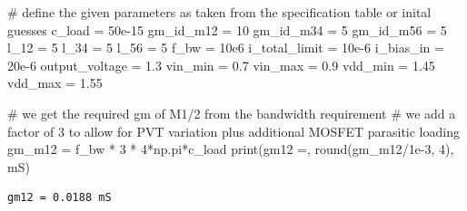 \documentclass[
  a4paper,
  DIV=11,
  numbers=noendperiod]{scrartcl}
\newenvironment{Shaded}{\begin{snugshade}}{\end{snugshade}}
\newcommand{\BuiltInTok}[1]{\textcolor[rgb]{0.00,0.23,0.31}{#1}}
\newcommand{\CommentTok}[1]{\textcolor[rgb]{0.37,0.37,0.37}{#1}}
\newcommand{\DecValTok}[1]{\textcolor[rgb]{0.68,0.00,0.00}{#1}}
\newcommand{\FloatTok}[1]{\textcolor[rgb]{0.68,0.00,0.00}{#1}}
\newcommand{\NormalTok}[1]{\textcolor[rgb]{0.00,0.23,0.31}{#1}}
\newcommand{\OperatorTok}[1]{\textcolor[rgb]{0.37,0.37,0.37}{#1}}
\newcommand{\StringTok}[1]{\textcolor[rgb]{0.13,0.47,0.30}{#1}}
\begin{document}
\begin{tcolorbox}
\begin{Shaded}
\begin{Highlighting}[]
\CommentTok{\# define the given parameters as taken from the specification table or inital guesses}
\NormalTok{c\_load }\OperatorTok{=} \FloatTok{50e{-}15}
\NormalTok{gm\_id\_m12 }\OperatorTok{=} \DecValTok{10}
\NormalTok{gm\_id\_m34 }\OperatorTok{=} \DecValTok{5}
\NormalTok{gm\_id\_m56 }\OperatorTok{=} \DecValTok{5}
\NormalTok{l\_12 }\OperatorTok{=} \DecValTok{5}
\NormalTok{l\_34 }\OperatorTok{=} \DecValTok{5}
\NormalTok{l\_56 }\OperatorTok{=} \DecValTok{5}
\NormalTok{f\_bw }\OperatorTok{=} \FloatTok{10e6}
\NormalTok{i\_total\_limit }\OperatorTok{=} \FloatTok{10e{-}6}
\NormalTok{i\_bias\_in }\OperatorTok{=} \FloatTok{20e{-}6}
\NormalTok{output\_voltage }\OperatorTok{=} \FloatTok{1.3}
\NormalTok{vin\_min }\OperatorTok{=} \FloatTok{0.7}
\NormalTok{vin\_max }\OperatorTok{=} \FloatTok{0.9}
\NormalTok{vdd\_min }\OperatorTok{=} \FloatTok{1.45}
\NormalTok{vdd\_max }\OperatorTok{=} \FloatTok{1.55}
\end{Highlighting}
\end{Shaded}

\begin{Shaded}
\begin{Highlighting}[]
\CommentTok{\# we get the required gm of M1/2 from the bandwidth requirement}
\CommentTok{\# we add a factor of 3 to allow for PVT variation plus additional MOSFET parasitic loading}
\NormalTok{gm\_m12 }\OperatorTok{=}\NormalTok{ f\_bw }\OperatorTok{*} \DecValTok{3} \OperatorTok{*} \DecValTok{4}\OperatorTok{*}\NormalTok{np.pi}\OperatorTok{*}\NormalTok{c\_load}
\BuiltInTok{print}\NormalTok{(}\StringTok{\textquotesingle{}gm12 =\textquotesingle{}}\NormalTok{, }\BuiltInTok{round}\NormalTok{(gm\_m12}\OperatorTok{/}\FloatTok{1e{-}3}\NormalTok{, }\DecValTok{4}\NormalTok{), }\StringTok{\textquotesingle{}mS\textquotesingle{}}\NormalTok{)}
\end{Highlighting}
\end{Shaded}

\begin{verbatim}
gm12 = 0.0188 mS
\end{verbatim}


\end{tcolorbox}
\end{document}
